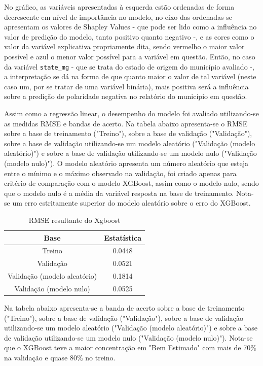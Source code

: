No gráfico, as variáveis apresentadas à esquerda estão ordenadas de forma decrescente em nível de importância no modelo, no eixo das ordenadas se apresentam os valores de Shapley Values - que pode ser lido como a influência no valor de predição do modelo, tanto positivo quanto negativo -, e as cores como o valor da variável explicativa propriamente dita, sendo vermelho o maior valor possível e azul o menor valor possível para a variável em questão. Então, no caso da variável \verb|state_mg| - que se trata do estado de origem do município avaliado -, a interpretação se dá na forma de que quanto maior o valor de tal variável (neste caso um, por se tratar de uma variável binária), mais positiva será a influência sobre a predição de polaridade negativa no relatório do município em questão.

Assim como a regressão linear, o desempenho do modelo foi avaliado utilizando-se as medidas RMSE e bandas de acerto. Na tabela abaixo apresenta-se o RMSE sobre a base de treinamento ("Treino"), sobre a base de validação ("Validação"), sobre a base de validação utilizando-se um modelo aleatório ("Validação (modelo aleatório)") e sobre a base de validação utilizando-se um modelo nulo ("Validação (modelo nulo)"). O modelo aleatório apresenta um número aleatório que esteja entre o mínimo e o máximo observado na validação, foi criado apenas para critério de comparação com o modelo XGBoost, assim como o modelo nulo, sendo que o modelo nulo é a média da variável resposta na base de treinamento. Nota-se um erro estritamente superior do modelo aleatório sobre o erro do XGBoost.

\begin{table}[h]
\centering
\caption{RMSE resultante do Xgboost}
\label{tab:cap3_rmse_xgboost}
\begin{tabular}{cc}
Base & Estatística \\
\hline
Treino & 0.0448 \\
Validação & 0.0521 \\
Validação (modelo aleatório) & 0.1814 \\
Validação (modelo nulo) & 0.0525 \\
\hline
\end{tabular}
\end{table}
\FloatBarrier

Na tabela abaixo apresenta-se a banda de acerto sobre a base de treinamento ("Treino"), sobre a base de validação ("Validação"), sobre a base de validação utilizando-se um modelo aleatório ("Validação (modelo aleatório)") e sobre a base de validação utilizando-se um modelo nulo ("Validação (modelo nulo)"). Nota-se que o XGBoost teve a maior concentração em "Bem Estimado" com mais de 70\% na validação e quase 80\% no treino.

